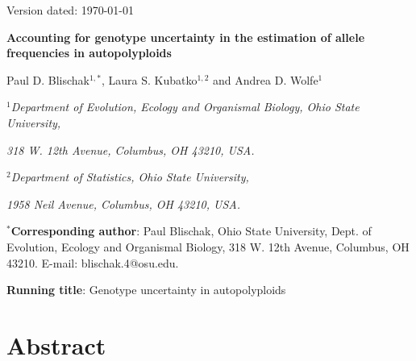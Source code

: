 \documentclass[11pt,english,letterpaper,oneside]{article}
\begin{document}
\newcommand{\tmat}{$\bm{T}$}
\newcommand{\rmat}{$\bm{R}$}
\newcommand{\etal}{\textit{et al}.}

\hfill Version dated: \mydate\today
\vspace{0.25in}

\begin{center}

{\LARGE  \bfseries Accounting for genotype uncertainty in the estimation of allele frequencies in autopolyploids}
\vspace{0.45in}

Paul D. Blischak$^{1,*}$, Laura S. Kubatko$^{1,2}$ and Andrea D. Wolfe$^1$
\vspace{0.45in}


\textit{$^1$Department of Evolution, Ecology and Organismal Biology, Ohio State University,}

\textit{318 W. 12th Avenue, Columbus, OH 43210, USA.}
\bigskip
\bigskip

\textit{$^2$Department of Statistics, Ohio State University,}

\textit{1958 Neil Avenue, Columbus, OH 43210, USA.}


\end{center}
\vspace{0.45in}


\noindent $^*$\textbf{Corresponding author}: Paul Blischak, Ohio State University, Dept. of Evolution, Ecology and Organismal Biology, 318 W. 12th Avenue, Columbus, OH 43210. E-mail: blischak.4@osu.edu.

\vspace{0.45in}

\noindent \textbf{Running title}: Genotype uncertainty in autopolyploids

\vspace{.45in}

\section*{Abstract}                      %
\end{document}
